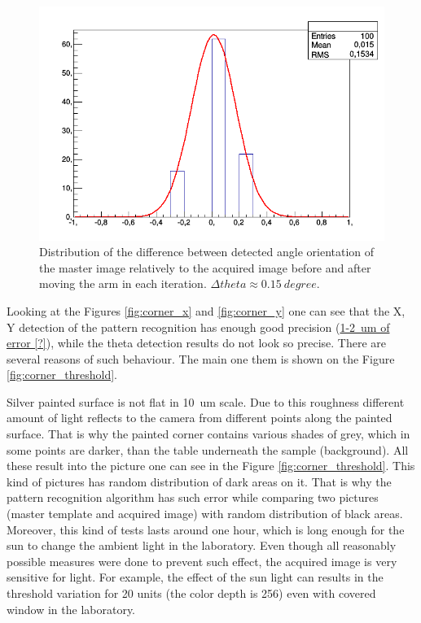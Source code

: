 \begin{figure}[ht]\centering
\includegraphics[width=0.8\linewidth]{Data/Precision_tests/Corner_c_theta.png}
\caption{Distribution of the difference between detected angle orientation of the master image relatively to the acquired image before and after moving the arm in each iteration. $\Delta theta \approx 0.15 ~degree$. }
\label{fig:corner_theta}
\end{figure}

Looking at the Figures \ref{fig:corner_x} and \ref{fig:corner_y} one can see that the X, Y detection of the pattern recognition has enough good precision (\underline{1-2~um of error [?]}), while the theta detection results do not look so precise. There are several reasons of such behaviour. The main one them is shown on the Figure \ref{fig:corner_threshold}.

Silver painted surface is not flat in 10~um scale. Due to this roughness different amount of light reflects to the camera from different points along the painted surface. That is why the painted corner contains various shades of grey, which in some points are darker, than the table underneath the sample (background). All these result into the picture one can see in the Figure \ref{fig:corner_threshold}. This kind of pictures has random distribution of dark areas on it. That is why the pattern recognition algorithm has such error while comparing two pictures (master template and acquired image) with random distribution of black areas. Moreover, this kind of tests lasts around one hour, which is long enough for the sun to change the ambient light in the laboratory. Even though all reasonably possible measures were done to prevent such effect, the acquired image is very sensitive for light. For example, the effect of the sun light can results in the threshold variation for 20 units (the color depth is 256) even with covered window in the laboratory.

